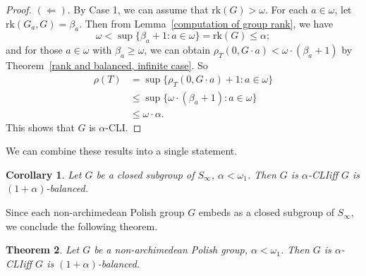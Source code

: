 \documentclass[11pt]{amsart}
\newtheorem{theorem}{Theorem}[section]
\newtheorem{corollary}[theorem]{Corollary}
\theoremstyle{definition}
\theoremstyle{remark}
\numberwithin{equation}{section}
\def\hier#1{$#1$-CLI}
\def\rk{\mathrm{rk}}
\begin{document}
\begin{proof}
$(\Leftarrow)$. By Case 1, we can assume that $\rk(G)>\omega$. For each $a\in\omega$, let $\rk(G_a,G)=\beta_a$. Then from Lemma~\ref{computation of group rank}, we have
$$\omega<\sup\{\beta_a+1:a\in\omega\}=\rk(G)\leq\alpha;$$
and for those $a\in\omega$ with $\beta_a\geq\omega$, we can obtain $\rho_T(0,G\cdot a)<\omega\cdot(\beta_a+1)$ by Theorem~\ref{rank and balanced, infinite case}. So
\begin{align*}
        \rho(T)&=\sup\{\rho_T(0,G\cdot a)+1:a\in\omega\}\\
        &\leq\sup\{\omega\cdot(\beta_a+1):a\in\omega\}\\
        &\leq\omega\cdot\alpha.
\end{align*}
This shows that $G$ is \hier\alpha.
\end{proof}

We can combine these results into a single statement.
\begin{corollary}\label{relation of balanced and CLI, closed subgroup of Sinfty}
    Let $G$ be a closed subgroup of $S_\infty$, $\alpha<\omega_1$. Then $G$ is \hier\alpha\space iff $G$ is $(1+\alpha)$-balanced.
\end{corollary}

Since each non-archimedean Polish group $G$ embeds as a closed subgroup of $S_\infty$, we conclude the following theorem.
\begin{theorem}\label{relation of balanced and CLI, non-archimedean case}
    Let $G$ be a non-archimedean Polish group, $\alpha<\omega_1$. Then $G$ is \hier\alpha\space iff $G$ is $(1+\alpha)$-balanced.
\end{theorem}
\end{document}
